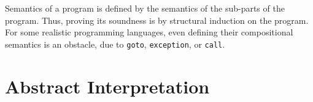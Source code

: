 \documentclass[12pt, twopage]{book}
\begin{document}
Semantics of a program is defined by the semantics of the sub-parts of
the program. Thus, proving its soundness is by structural induction on
the program. For some realistic programming languages, even defining
their compositional semantics is an obstacle, due to \texttt{goto},
\texttt{exception}, or \texttt{call}.




\chapter{Abstract Interpretation}
\label{chap:ai}
\end{document}

